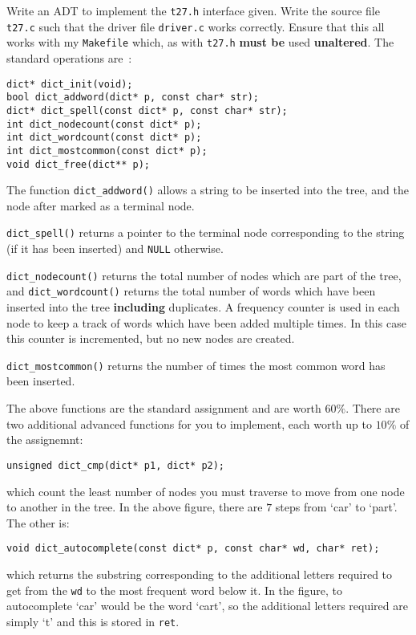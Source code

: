 \begin{exercise}
Write an ADT to implement the \verb^t27.h^ interface given.  Write the
source file \verb^t27.c^ such that the driver file \verb^driver.c^
works correctly.  Ensure that this all works with my \verb^Makefile^
which, as with \verb^t27.h^ {\bf must be} used {\bf unaltered}.
The standard operations are~:
\begin{verbatim}
dict* dict_init(void);
bool dict_addword(dict* p, const char* str);
dict* dict_spell(const dict* p, const char* str);
int dict_nodecount(const dict* p);
int dict_wordcount(const dict* p);
int dict_mostcommon(const dict* p);
void dict_free(dict** p);
\end{verbatim}

\noindent The function \verb^dict_addword()^ allows a string to be
inserted into the tree, and the node after marked as a terminal node.

\noindent \verb^dict_spell()^ returns a pointer to the terminal
node corresponding to the string (if it has been inserted) and \verb^NULL^
otherwise.

\noindent \verb^dict_nodecount()^ returns the total number of nodes
which are part of the tree, and \verb^dict_wordcount()^ returns the total
number of words which have been inserted into the tree {\bf including}
duplicates.  A frequency counter is used in each node to keep a track
of words which have been added multiple times. In this case this counter
is incremented, but no new nodes are created.

\noindent \verb^dict_mostcommon()^ returns the number of times the most
common word has been inserted.

\noindent The above functions are the standard assignment and are worth
$60\%$.  There are two additional advanced functions for you to implement, each
worth up to $10\%$ of the assignemnt:
\begin{verbatim}
unsigned dict_cmp(dict* p1, dict* p2);
\end{verbatim}
which count the least number of nodes you must traverse to move from one node
to another in the tree. In the above figure, there are $7$ steps from `car'
to `part'. The other is:
\begin{verbatim}
void dict_autocomplete(const dict* p, const char* wd, char* ret);
\end{verbatim}
which returns the substring corresponding to the additional letters required to
get from the \verb^wd^ to the most frequent word below it. In the figure, to
autocomplete `car' would be the word `cart', so the additional letters required
are simply `t' and this is stored in \verb^ret^.


\end{exercise}
